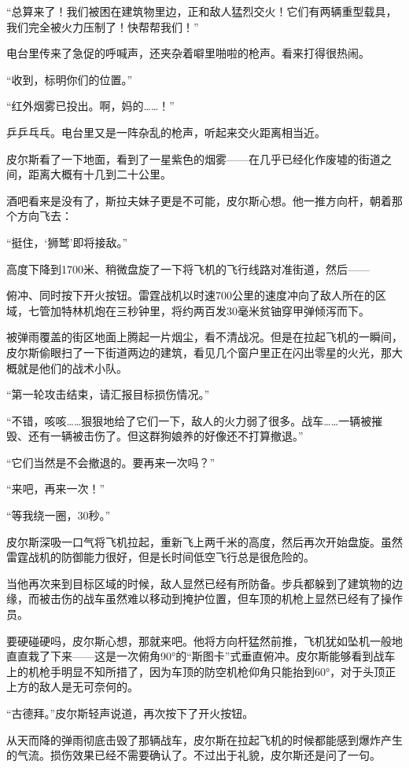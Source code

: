 “总算来了！我们被困在建筑物里边，正和敌人猛烈交火！它们有两辆重型载具，我们完全被火力压制了！快帮帮我们！”

电台里传来了急促的呼喊声，还夹杂着噼里啪啦的枪声。看来打得很热闹。

“收到，标明你们的位置。”

“红外烟雾已投出。啊，妈的……！”

乒乒乓乓。电台里又是一阵杂乱的枪声，听起来交火距离相当近。

皮尔斯看了一下地面，看到了一星紫色的烟雾——在几乎已经化作废墟的街道之间，距离大概有十几到二十公里。

酒吧看来是没有了，斯拉夫妹子更是不可能，皮尔斯心想。他一推方向杆，朝着那个方向飞去：

“挺住，‘狮鹫’即将接敌。”

高度下降到1700米、稍微盘旋了一下将飞机的飞行线路对准街道，然后——

俯冲、同时按下开火按钮。雷霆战机以时速700公里的速度冲向了敌人所在的区域，七管加特林机炮在三秒钟里，将约两百发30毫米贫铀穿甲弹倾泻而下。

被弹雨覆盖的街区地面上腾起一片烟尘，看不清战况。但是在拉起飞机的一瞬间，皮尔斯偷眼扫了一下街道两边的建筑，看见几个窗户里正在闪出零星的火光，那大概就是他们的战术小队。

“第一轮攻击结束，请汇报目标损伤情况。”

“不错，咳咳……狠狠地给了它们一下，敌人的火力弱了很多。战车……一辆被摧毁、还有一辆被击伤了。但这群狗娘养的好像还不打算撤退。”

“它们当然是不会撤退的。要再来一次吗？”

“来吧，再来一次！”

“等我绕一圈，30秒。”

皮尔斯深吸一口气将飞机拉起，重新飞上两千米的高度，然后再次开始盘旋。虽然雷霆战机的防御能力很好，但是长时间低空飞行总是很危险的。

当他再次来到目标区域的时候，敌人显然已经有所防备。步兵都躲到了建筑物的边缘，而被击伤的战车虽然难以移动到掩护位置，但车顶的机枪上显然已经有了操作员。

要硬碰硬吗，皮尔斯心想，那就来吧。他将方向杆猛然前推，飞机犹如坠机一般地直直栽了下来——这是一次俯角90°的“斯图卡”式垂直俯冲。皮尔斯能够看到战车上的机枪手明显不知所措了，因为车顶的防空机枪仰角只能抬到60°，对于头顶正上方的敌人是无可奈何的。

“古德拜。”皮尔斯轻声说道，再次按下了开火按钮。

从天而降的弹雨彻底击毁了那辆战车，皮尔斯在拉起飞机的时候都能感到爆炸产生的气流。损伤效果已经不需要确认了。不过出于礼貌，皮尔斯还是问了一句。

